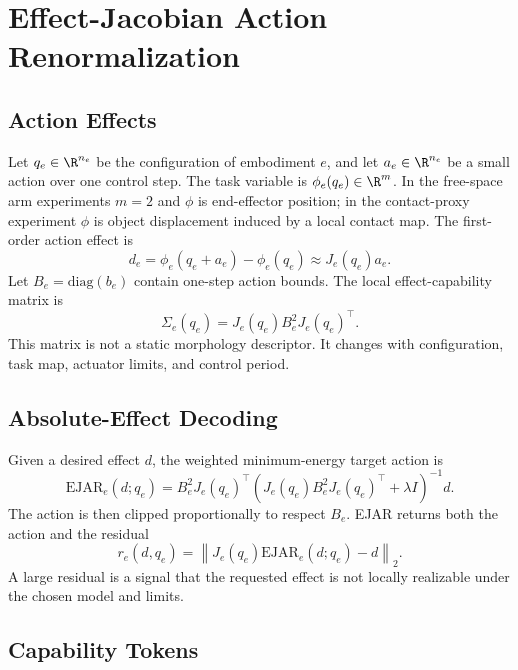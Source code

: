 \documentclass{article}
\newcommand{\EJAR}{\mathrm{EJAR}}
\newcommand{\diag}{\mathrm{diag}}
\begin{document}
\section{Effect-Jacobian Action Renormalization}

\subsection{Action Effects}

Let $q_e\in\R^{n_e}$ be the configuration of embodiment $e$, and let $a_e\in\R^{n_e}$ be a small action over one control step. The task variable is $\phi_e(q_e)\in\R^m$. In the free-space arm experiments $m=2$ and $\phi$ is end-effector position; in the contact-proxy experiment $\phi$ is object displacement induced by a local contact map. The first-order action effect is
\begin{equation}
d_e = \phi_e(q_e+a_e)-\phi_e(q_e)\approx J_e(q_e)a_e.
\end{equation}
Let $B_e=\diag(b_e)$ contain one-step action bounds. The local effect-capability matrix is
\begin{equation}
\Sigma_e(q_e)=J_e(q_e)B_e^2J_e(q_e)^\top.
\end{equation}
This matrix is not a static morphology descriptor. It changes with configuration, task map, actuator limits, and control period.

\subsection{Absolute-Effect Decoding}

Given a desired effect $d$, the weighted minimum-energy target action is
\begin{equation}
\EJAR_e(d;q_e)=B_e^2J_e(q_e)^\top
\left(J_e(q_e)B_e^2J_e(q_e)^\top+\lambda I\right)^{-1}d.
\end{equation}
The action is then clipped proportionally to respect $B_e$. EJAR returns both the action and the residual
\begin{equation}
r_e(d,q_e)=\left\|J_e(q_e)\EJAR_e(d;q_e)-d\right\|_2.
\end{equation}
A large residual is a signal that the requested effect is not locally realizable under the chosen model and limits.

\subsection{Capability Tokens}
\end{document}
